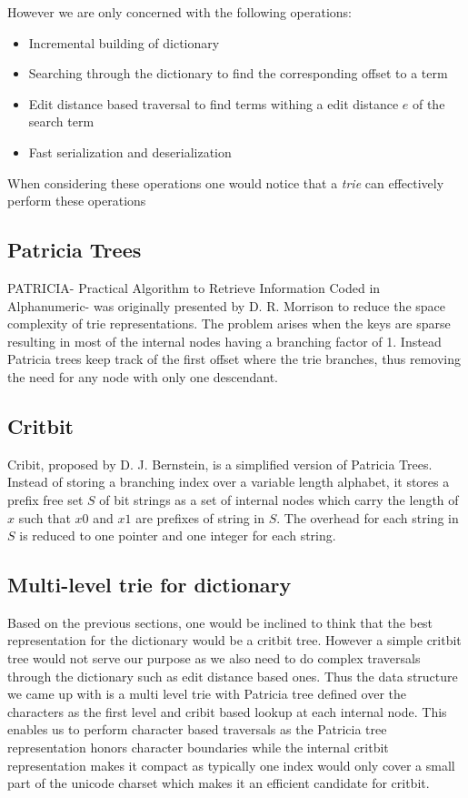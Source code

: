 However we are only concerned with the following operations:
\begin{itemize}
\item Incremental building of dictionary
\item Searching through the dictionary to find the corresponding offset to a term
\item Edit distance based traversal to find terms withing a edit distance $e$ of the search term
\item Fast serialization and deserialization
\end{itemize}
When considering these operations one would notice that a \textit{trie}\cite{fredkin1960trie} can effectively perform these operations

\subsection{Patricia Trees}
PATRICIA- Practical Algorithm to Retrieve Information Coded in Alphanumeric- was originally presented by D. R. Morrison\cite{morrison1968patricia}
to reduce the space complexity of trie representations.
The problem arises when the keys are sparse resulting in most of the internal nodes having a branching factor of 1.
Instead Patricia trees keep track of the first offset where the trie branches, thus removing the need for any node with only one descendant.

\subsection{Critbit}
Cribit, proposed by D. J. Bernstein\cite{bernsteinCritbit}, is a simplified version of Patricia Trees.
Instead of storing a branching index over a variable length alphabet, it stores a prefix free set $S$ of bit strings
as a set of internal nodes which carry the length of $x$ such that $x0$ and $x1$ are prefixes of string in $S$.
The overhead for each string in $S$ is reduced to one pointer and one integer for each string.

\subsection{Multi-level trie for dictionary}
Based on the previous sections, one would be inclined to think that the best representation for the dictionary would be a critbit tree.
However a simple critbit tree would not serve our purpose as we also need to do complex traversals through the dictionary such as edit distance based ones.
Thus the data structure we came up with is a multi level trie with Patricia tree defined over the characters as the first level
and cribit based lookup at each internal node.
This enables us to perform character based traversals as the Patricia tree representation honors character boundaries
while the internal critbit representation makes it compact as typically one index would only cover a small part of the unicode charset which makes it
an efficient candidate for critbit.

